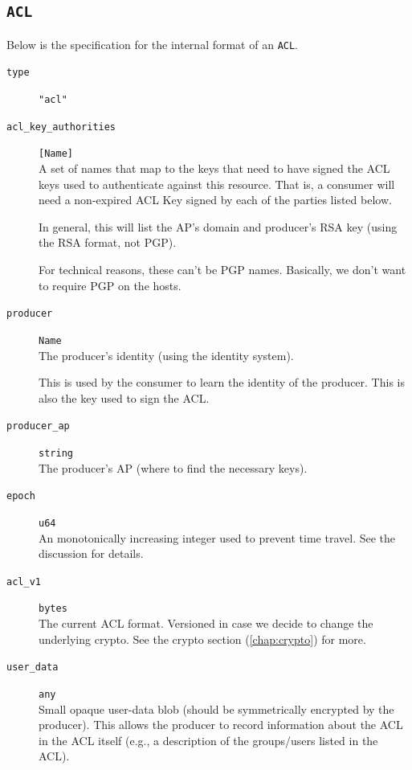 \documentclass[pdftex,12pt,a4papaer,twoside,notitlepage]{report}
\begin{document}
\begin{appendices}
\subsection{\texttt{ACL}}

Below is the specification for the internal format of an \texttt{ACL}.

\begin{leftbar}
\begin{description}
\item[\texttt{type}] \verb|"acl"|
\item[\texttt{acl\_key\_authorities}] \verb=[Name]= \\
  A set of names that map to the keys that need to have signed the ACL keys used
  to authenticate against this resource. That is, a consumer will need a
  non-expired ACL Key signed by each of the parties listed below.
  
  In general, this will list the AP's domain and producer's RSA key (using the
  RSA format, not PGP).
  
  For technical reasons, these can't be PGP names. Basically, we don't want to
  require PGP on the hosts.

\item[\texttt{producer}] \texttt{Name} \\
  The producer's identity (using the identity system).
  
  This is used by the consumer to learn the identity of the producer. This is
  also the key used to sign the ACL.

\item[\texttt{producer\_ap}] \texttt{string} \\
  The producer's AP (where to find the necessary keys).

\item[\texttt{epoch}] \texttt{u64} \\
  An monotonically increasing integer used to prevent
  time travel. See the discussion for details.

\item[\texttt{acl\_v1}] \texttt{bytes} \\
  The current ACL format. Versioned in case we decide to change the underlying
  crypto. See the crypto section (\cref{chap:crypto}) for more.

\item[\texttt{user\_data}] \texttt{any} \\
  Small opaque user-data blob (should be symmetrically encrypted by the
  producer). This allows the producer to record information about the ACL in the
  ACL itself (e.g., a description of the groups/users listed in the ACL).
\end{description}
\end{leftbar}


\end{appendices}
\end{document}
